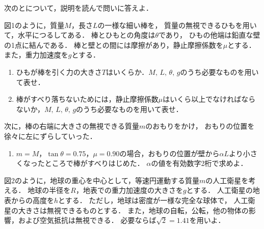 \setcounter{figure}{0}

次のとについて，説明を読んで問いに答えよ．


図1のように，質量$M$，長さ$L$の一様な細い棒を，
質量の無視できるひもを用いて，水平につるしてある．
棒とひもとの角度は$\theta$であり，
ひもの他端は鉛直な壁の1点に結んである．
棒と壁との間には摩擦があり，静止摩擦係数を$\mu$とする．
また，重力加速度を$g$とする．


\begin{enumerate}[（1）]
  \setlength{\leftskip}{-1zw}
  \setlength{\itemindent}{1zw}\setlength{\labelsep}{0.5zw}
  \setlength{\labelwidth}{1zw}\setlength{\leftmargin}{1zw}
  \setlength{\itemsep}{0.5\baselineskip}
  \item ひもが棒を引く力の大きさ$T$はいくらか．$M,\,L,\,\theta,\,g$のうち必要なものを用いて表せ．
  \item 棒がすべり落ちないためには，静止摩擦係数$\mu$はいくら以上でなければならないか，$M,\,L,\,\theta,\,g$のうち必要なものを用いて表せ．
\end{enumerate}

次に，棒の右端に大きさの無視できる質量$m$のおもりをかけ，
おもりの位置を徐々に左にずらしていった．


\begin{enumerate}[（1）]
  \setlength{\leftskip}{-1zw}
  \setlength{\itemindent}{1zw}\setlength{\labelsep}{0.5zw}
  \setlength{\labelwidth}{1zw}\setlength{\leftmargin}{1zw}
  \setlength{\itemsep}{0.5\baselineskip}
  \addtocounter{enumi}{2}
  \item $m=M$，$\tan{\theta}=0.75$，$\mu =0.90$の場合，おもりの位置が壁から$\alpha L$より小さくなったところで棒がすべりはじめた．
  $\alpha$の値を有効数字2桁で求めよ．
\end{enumerate}


図2のように，地球の重心を中心として，等速円運動する質量$m$の人工衛星を考える．
地球の半径を$R$，地表での重力加速度の大きさを$g$とする．
人工衛星の地表からの高度を$h$とする．
ただし，地球は密度が一様な完全な球体で，
人工衛星の大きさは無視できるものとする．
また，地球の自転，公転，他の物体の影響，および空気抵抗は無視できる．
必要ならば$\sqrt{2}=1.41$を用いよ．


